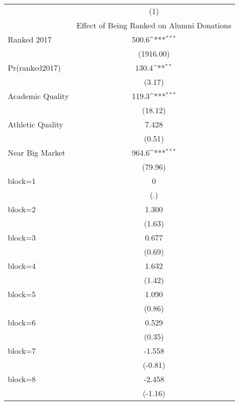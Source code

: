 {
\def\sym#1{\ifmmode^{#1}\else\(^{#1}\)\fi}
\begin{longtable}{l*{1}{c}}
\hline\hline\endfirsthead\hline\endhead\hline\endfoot\endlastfoot
                    &\multicolumn{1}{c}{(1)}\\
                    &\multicolumn{1}{c}{Effect of Being Ranked on Alumni Donations}\\
\hline
Ranked 2017         &       500.6\sym{***}\\
                    &   (1916.00)         \\
[1em]
Pr(ranked2017)      &       130.4\sym{**} \\
                    &      (3.17)         \\
[1em]
Academic Quality    &       119.3\sym{***}\\
                    &     (18.12)         \\
[1em]
Athletic Quality    &       7.428         \\
                    &      (0.51)         \\
[1em]
Near Big Market     &       964.6\sym{***}\\
                    &     (79.96)         \\
[1em]
block=1             &           0         \\
                    &         (.)         \\
[1em]
block=2             &       1.300         \\
                    &      (1.63)         \\
[1em]
block=3             &       0.677         \\
                    &      (0.69)         \\
[1em]
block=4             &       1.632         \\
                    &      (1.42)         \\
[1em]
block=5             &       1.090         \\
                    &      (0.86)         \\
[1em]
block=6             &       0.529         \\
                    &      (0.35)         \\
[1em]
block=7             &      -1.558         \\
                    &     (-0.81)         \\
[1em]
block=8             &      -2.458         \\
                    &     (-1.16)         \\

\end{longtable}}
